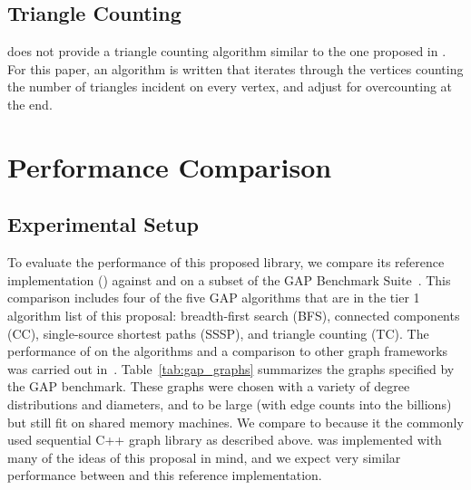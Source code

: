 \subsection{Triangle Counting}
\bgl does not provide a triangle counting algorithm
similar to the one proposed in \stdgraph.
For this paper, an algorithm is written that iterates through the vertices counting the number of triangles
incident on every vertex, and adjust for overcounting at the end.


\clearpage

\section{Performance Comparison} \label{performance}
\subsection{Experimental Setup}
To evaluate the performance of this proposed library, we compare its reference implementation
(\stdgraph) against \bgl and \nwgraph on a subset of the GAP Benchmark Suite~\cite{beamer2015gap}.
This comparison includes four of the five GAP algorithms that are in the tier 1 algorithm list of this proposal:
breadth-first search (BFS), connected components (CC), single-source shortest paths (SSSP), 
and triangle counting (TC).  The performance of \nwgraph on the algorithms and a comparison to other
graph frameworks was carried out in~\cite{gapbs_2023}.
Table~\ref{tab:gap_graphs} summarizes the graphs specified by the GAP benchmark.
These graphs were chosen with a variety of degree distributions and diameters, and to be large (with edge counts into the billions) but still fit on shared memory machines.
{\color{red} We compare to \bgl because it the commonly used sequential C++ graph library as described above.}
\nwgraph was implemented with many of the ideas of this proposal in mind, and we expect very similar performance
between \nwgraph and this reference implementation.


